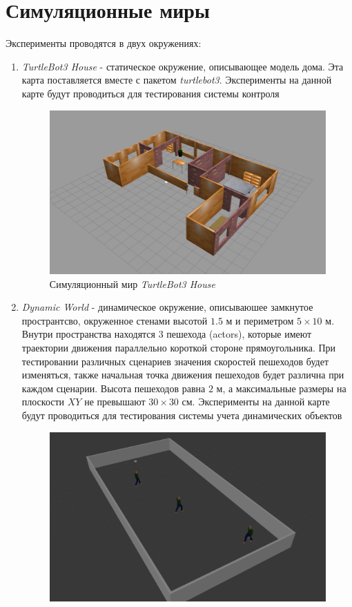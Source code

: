 \section{Симуляционные миры}

Эксперименты проводятся в двух окружениях:
\begin{enumerate}
    \item \textit{TurtleBot3 House} - статическое окружение, описывающее модель дома. Эта карта поставляется вместе с пакетом \textit{turtlebot3}. Эксперименты на данной карте будут проводиться для тестирования системы контроля
\begin{figure}[H]
    \centering
    \includegraphics{images/chap_4/tb3-house.png}
    \caption{Симуляционный мир \textit{TurtleBot3 House}}
    \label{fig:tb3-house}
\end{figure}
    \item \textit{Dynamic World} - динамическое окружение, описываюшее замкнутое пространтсво, окруженное стенами высотой $1.5$ м и периметром $5\times10$ м. Внутри пространства находятся 3 пешехода (actors), которые имеют траектории движения параллельно короткой стороне прямоугольника. При тестировании различных сценариев значения скоростей пешеходов будет изменяться, также начальная точка движения пешеходов будет различна при каждом сценарии. Высота пешеходов равна $2$ м, а максимальные размеры на плоскости $XY$ не превышают $30\times30$ см. Эксперименты на данной карте будут проводиться для тестирования системы учета динамических объектов
\begin{figure}[H]
    \centering
    \includegraphics{images/chap_4/dyn-world.png}

\end{figure}
\end{enumerate}
